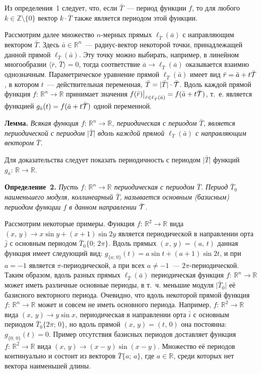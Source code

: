 Из определения~1 следует, что, если $\bar{T}$~--- период функции $f$, то для любого  $k\in{\mathbb Z}\setminus\lbrace 0\rbrace$ вектор $k\cdot\bar{T}$ также является периодом этой функции.

Рассмотрим далее множество $n$-мерных прямых $\ell_{\bar{T}}(\bar{a})$ с направляющим вектором $\bar{T}$. Здесь $\bar{a}\in{\mathbb R}^{n}$~---  радиус-вектор некоторой точки, принадлежащей данной прямой $\ell_{\bar{T}}(\bar{a})$. Эту точку можно выбирать, например, в линейном многообразии $\langle\bar{r},\,\bar{T}\rangle=0$, тогда соответствие $\bar{a}\to\ell_{\bar{T}}(\bar{a})$ оказывается взаимно однозначным. Параметрическое уравнение прямой $\ell_{\bar{T}}(\bar{a})$ имеет вид  $\bar{r}=\bar{a}+t\bar{{\cal T}}$, в котором $t$~--- действительная переменная, $\bar{T}=\vert\bar{T}\vert\cdot\bar{{\cal T}}$. Вдоль каждой прямой функция $f:\,{\mathbb R}^{n}\to {\mathbb R}$ принимает значения $\bigl.f(\bar{r})\bigr|_{\bar{r}\in\ell_{\bar{T}}(\bar{a})}=f(\bar{a}+t\bar{{\cal T}})$, т.~е. является функцией $g_{\bar{a}}(t)=f(\bar{a}+t\bar{{\cal T}})$ одной переменной.

\textbf{Лемма.} {\it Всякая функция $f:\,{\mathbb R}^{n}\to {\mathbb R}$,  периодическая с периодом $\bar{T}$, является периодической с периодом $\vert\bar{T}\vert$ вдоль каждой прямой $\ell_{\bar{T}}(\bar{a})$ с направляющим вектором $\bar{T}$.}

Для доказательства следует показать периодичность с периодом $\vert\bar{T}\vert$  функций $g_{\bar{a}}:\,{\mathbb R}\to{\mathbb R}$.

\textbf{Определение~2.} {\it Пусть $f:\,{\mathbb R}^{n}\to {\mathbb R}$  периодическая с периодом $\bar{T}$. Период $\bar{T}_{0}$ наименьшего модуля, коллинеарный $\bar{T}$, называется основным (базисным) периодом функции $f$ в данном направлении $\bar{{\cal T}}$.}

Рассмотрим некоторые примеры. Функция $f:\,{\mathbb R}^{2}\to{\mathbb R}$ вида $(x,\,y)\to x\sin y+(x+1)\sin 2y$ является периодической в направлении орта $\bar{j}$ с основным периодом $\bar{T}_{0}\lbrace0;\,2\pi\rbrace$. Вдоль прямых $(x,\,y)=(a,\,t)$ данная функция имеет следующий вид: $g_{\lbrace a;\,0\rbrace}(t)=a\sin t+(a+1)\sin 2t$, и при $a=-1$ является $\pi$-периодической, а при всех $a\neq-1$~--- $2\pi$-периодической. Таким образом, вдоль разных прямых $\ell_{\bar{T}}(\bar{a})$ периодическая функция $f:\,{\mathbb R}^{n}\to{\mathbb R}$ может иметь различные основные периоды, в т.~ч. меньшие модуля $\vert\bar{T}_{0}\vert$ её базисного векторного периода. Очевидно, что вдоль некоторой прямой функция $f:\,{\mathbb R}^{n}\to{\mathbb R}$ может и совсем не иметь основного периода. Например, $f:\,{\mathbb R}^{2}\to{\mathbb R}$ вида $(x,\,y)\to y\sin x$, периодическая в направлении орта $\bar{i}$ с основным периодом $\bar{T}_{0}\lbrace 2\pi;\,0\rbrace$, но вдоль прямой $(x,\,y)=(t,\,0)$ она постоянна: $g_{\lbrace 0;\,0\rbrace}(t)=0$. Пример отсутствия базисных периодов доставляет функция $f:\,{\mathbb R}^{2}\to{\mathbb R}$ вида $(x,\,y)\to(x-y)\sin(x-y)$. Множество её периодов континуально и состоит из векторов $\bar{T}\lbrace a;\,a\rbrace$, где $a\in{\mathbb R}$, среди которых нет вектора наименьшей длины.

